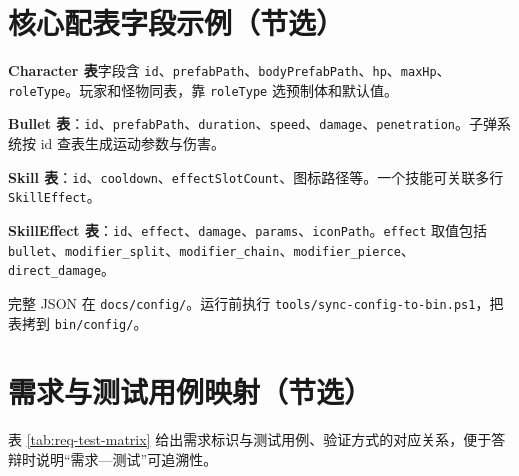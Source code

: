 \documentclass[UTF8,a4paper]{ctexart}
\begin{document}
\chapter{核心配表字段示例（节选）}
\label{app:config}

\textbf{Character 表}字段含 \texttt{id}、\texttt{prefabPath}、\texttt{bodyPrefabPath}、\texttt{hp}、\texttt{maxHp}、\texttt{roleType}。玩家和怪物同表，靠 \texttt{roleType} 选预制体和默认值。

\textbf{Bullet 表}：\texttt{id}、\texttt{prefabPath}、\texttt{duration}、\texttt{speed}、\texttt{damage}、\texttt{penetration}。子弹系统按 id 查表生成运动参数与伤害。

\textbf{Skill 表}：\texttt{id}、\texttt{cooldown}、\texttt{effectSlotCount}、图标路径等。一个技能可关联多行 \texttt{SkillEffect}。

\textbf{SkillEffect 表}：\texttt{id}、\texttt{effect}、\texttt{damage}、\texttt{params}、\texttt{iconPath}。\texttt{effect} 取值包括 \texttt{bullet}、\texttt{modifier\_split}、\texttt{modifier\_chain}、\texttt{modifier\_pierce}、\texttt{direct\_damage}。

完整 JSON 在 \texttt{docs/config/}。运行前执行 \texttt{tools/sync-config-to-bin.ps1}，把表拷到 \texttt{bin/config/}。

\chapter{需求与测试用例映射（节选）}
\label{app:req-test}

表 \ref{tab:req-test-matrix} 给出需求标识与测试用例、验证方式的对应关系，便于答辩时说明“需求—测试”可追溯性。
\end{document}
